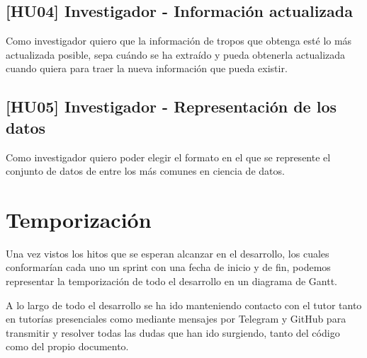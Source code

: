 \subsection{[HU04] Investigador - Información actualizada}
Como investigador quiero que la información de tropos que obtenga esté lo más actualizada posible, sepa cuándo se ha extraído y pueda obtenerla actualizada cuando quiera para traer la nueva información que pueda existir.

\subsection{[HU05] Investigador - Representación de los datos}
Como investigador quiero poder elegir el formato en el que se represente el
conjunto de datos de entre los más comunes en ciencia de datos.

\section{Temporización}
Una vez vistos los hitos que se esperan alcanzar en el desarrollo, los cuales conformarían cada uno un sprint con una fecha de inicio y de fin, podemos representar la temporización de todo el desarrollo en un diagrama de Gantt.

A lo largo de todo el desarrollo se ha ido manteniendo contacto con el tutor tanto en tutorías presenciales como mediante mensajes por Telegram y GitHub para transmitir y resolver todas las dudas que han ido surgiendo, tanto del código como del propio documento.